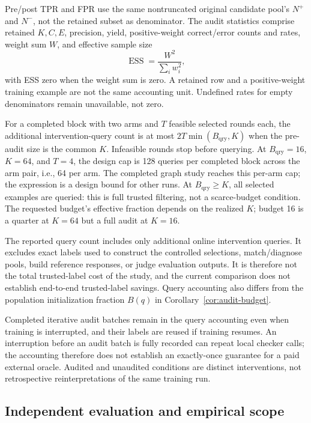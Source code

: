 Pre/post TPR and FPR use the same nontruncated original candidate pool's
$N^+$ and $N^-$,
not the retained subset as denominator. The audit statistics comprise
retained $K,C,E$, precision, yield, positive-weight correct/error counts
and rates, weight sum $W$, and effective sample size
\[
 \operatorname{ESS}=\frac{W^2}{\sum_iw_i^2},
\]
with ESS zero when the weight sum is zero. A retained row and a
positive-weight training example are not the same accounting unit.
Undefined rates for empty denominators remain unavailable, not zero.

For a completed block with two arms and $T$ feasible selected rounds each,
the additional intervention-query count is at most
$2T\min(B_{\mathrm{qry}},K)$ when the pre-audit size is the common $K$.
Infeasible rounds stop before querying. At $B_{\mathrm{qry}}=16$, $K=64$,
and $T=4$, the design cap is 128 queries per completed block across the arm
pair, i.e., 64 per arm. The completed graph study reaches this per-arm cap;
the expression is a design bound for other runs.
At $B_{\mathrm{qry}}\geq K$, all selected examples are queried: this is
full trusted filtering, not a scarce-budget condition. The requested
budget's effective fraction depends on the realized $K$;
budget 16 is a quarter at $K=64$ but a full audit at $K=16$.

The reported query count includes only additional online intervention queries.
It excludes exact labels used to construct the controlled selections,
match/diagnose pools, build reference responses, or judge evaluation outputs.
It is therefore not the total trusted-label cost of the study, and the
current comparison does not establish end-to-end trusted-label savings.
Query accounting also differs from the
population initialization fraction $B(q)$ in Corollary~\ref{cor:audit-budget}.

Completed iterative audit batches remain in the query accounting even
when training is interrupted, and their labels are reused if training
resumes. An interruption before an audit batch is fully recorded can
repeat local checker calls; the accounting therefore does not establish
an exactly-once guarantee for a paid external oracle. Audited and
unaudited conditions are distinct interventions, not retrospective
reinterpretations of the same training run.

\subsection{Independent evaluation and empirical scope}

